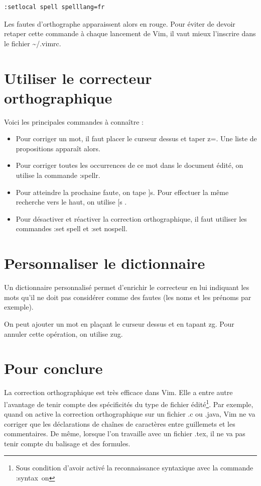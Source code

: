 \documentclass[pdftex,a4paper,11pt]{article}
\begin{document}
\begin{verbatim}
:setlocal spell spelllang=fr
\end{verbatim}

Les fautes d'orthographe apparaissent alors en rouge. Pour éviter de devoir retaper cette commande à chaque lancement de Vim, il vaut mieux l'inscrire dans le fichier \textasciitilde{}/.vimrc.


\section{Utiliser le correcteur orthographique}
Voici les principales commandes à connaître :
\begin{itemize}
	\item Pour corriger un mot, il faut placer le curseur dessus et taper \og{}z=\fg{}. Une liste de propositions apparaît alors.
	\item Pour corriger toutes les occurrences de ce mot dans le document édité, on utilise la commande \og{}:spellr\fg{}.
	\item Pour atteindre la prochaine faute, on tape \og{}]s\fg{}. Pour effectuer la même recherche vers le haut, on utilise \og [s \fg.
	\item Pour désactiver et réactiver la correction orthographique, il faut utiliser les commandes \og{}:set spell\fg{} et \og{}:set nospell\fg{}.
\end{itemize}


\section{Personnaliser le dictionnaire}
Un dictionnaire personnalisé permet d'enrichir le correcteur en lui indiquant les mots qu'il ne doit pas considérer comme des fautes (les noms et les prénoms par exemple).

On peut ajouter un mot en plaçant le curseur dessus et en tapant \og{}zg\fg{}. Pour annuler cette opération, on utilise \og{}zug\fg{}.


\section{Pour conclure}
La correction orthographique est très efficace dans Vim. Elle a entre autre l'avantage de tenir compte des spécificités du type de fichier édité\footnote{Sous condition d'avoir activé la reconnaissance syntaxique avec la commande \og{}:syntax~on\fg{}}. Par exemple, quand on active la correction orthographique sur un fichier .c ou .java, Vim ne va corriger que les déclarations de chaînes de caractères entre guillemets et les commentaires. De même, lorsque l'on travaille avec un fichier .tex, il ne va pas tenir compte du balisage et des formules.
\end{document}
